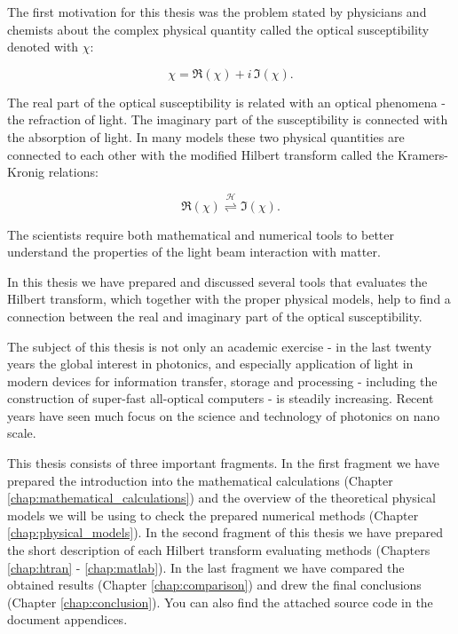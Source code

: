\documentclass[12pt,twoside,a4paper]{article}
\numberwithin{equation}{subsection}
\numberwithin{figure}{subsection}
\begin{document}
The first motivation for this thesis was the problem stated by physicians and chemists about the complex physical quantity called the
optical susceptibility denoted with $\chi$:

\begin{equation} \label{eq:pra_susceptibility}
	\chi = \Re (\chi) + i \, \Im (\chi) . 
\end{equation}

The real part of the optical susceptibility is related with an optical phenomena - the refraction of light.
The imaginary part of the susceptibility is connected with the absorption of light. In many models these two physical quantities are connected
to each other with the modified Hilbert transform called the Kramers-Kronig relations:


\begin{equation} \label{eq:pra_hilbert_connection} 
	 \Re (\chi)  \overset{\mathcal{H}}{\rightleftharpoons} \Im (\chi) .
\end{equation}

The scientists require both mathematical and numerical tools to better understand the properties of the light beam interaction with matter. 

In this thesis we have prepared and discussed several tools that evaluates the Hilbert transform, which together with the proper physical
models, help to find a connection between the real and imaginary part of the optical susceptibility.   

The subject of this thesis is not only an academic exercise - in the last twenty years the global interest in photonics, and
especially application of light in modern devices for information transfer, storage and processing - including the construction of super-fast
all-optical computers - is steadily increasing. Recent years have seen much focus on the science and technology of photonics on
nano scale. 

This thesis consists of three important fragments. In the first fragment we have prepared the introduction into the mathematical calculations
(Chapter \ref{chap:mathematical_calculations}) and the overview of the theoretical physical models we will be using to check the
prepared numerical methods (Chapter \ref{chap:physical_models}). In the second fragment of this thesis we have prepared the short description of
each Hilbert transform evaluating methods (Chapters \ref{chap:htran} - \ref{chap:matlab}). In the last fragment we have compared the obtained
results (Chapter \ref{chap:comparison}) and drew the final conclusions (Chapter \ref{chap:conclusion}). You can also find the attached
source code in the document appendices.
\end{document}
